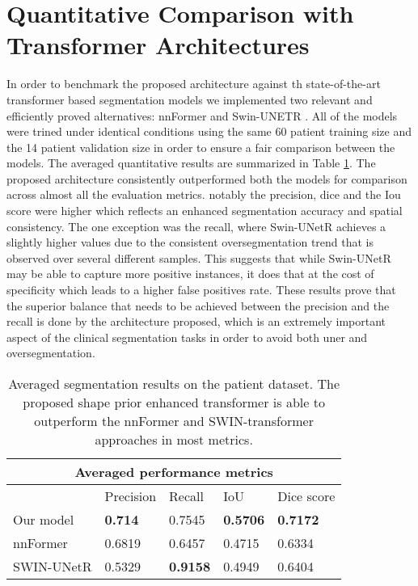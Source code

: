 \section{Quantitative Comparison with Transformer Architectures}
In order to benchmark the proposed architecture against th state-of-the-art transformer based segmentation models we implemented two relevant and efficiently proved alternatives: nnFormer \cite{zhou2023nnformer} and Swin-UNETR \cite{10.1007/978-3-031-08999-2_22}. All of the models were trined under identical conditions using the same 60 patient training size and the 14 patient validation size in order to ensure a fair comparison between the models. The averaged quantitative results are summarized in Table \ref{tab:quantitative_comparison}. The proposed architecture consistently outperformed both the models for comparison across almost all the evaluation metrics. notably the precision, dice and the Iou score were higher which reflects an enhanced segmentation accuracy and spatial consistency. The one exception was the recall, where Swin-UNetR achieves a slightly higher values due to the consistent oversegmentation trend that is observed over several different samples. This suggests that while Swin-UNetR may be able to capture more positive instances, it does that at the cost of specificity which leads to a higher false positives rate. These results prove that the superior balance that needs to be achieved between the precision and the recall is done by the architecture proposed, which is an extremely important aspect of the clinical segmentation tasks in order to avoid both uner and oversegmentation.

\begin{table}[h!t]
    \begin{tabular}{ |p{2.3cm}|p{2.3cm}|p{2.3cm}|p{2.3cm}|p{2.3cm}|}
            \hline
            \multicolumn{5}{|c|}{Averaged performance metrics} \\
            \hline
             & Precision & Recall & IoU & Dice score \\
            \hline
            Our model & \textbf{0.714} & 0.7545 & \textbf{0.5706} & \textbf{0.7172} \\
            \hline
            nnFormer & 0.6819 & 0.6457 & 0.4715 & 0.6334 \\
            \hline
            SWIN-UNetR & 0.5329 & \textbf{0.9158} & 0.4949 & 0.6404 \\
            \hline
    \end{tabular}
    \caption{Averaged segmentation results on the patient dataset. The proposed shape prior enhanced transformer is able to outperform the nnFormer \cite{zhou2023nnformer} and SWIN-transformer \cite{10.1007/978-3-031-08999-2_22} approaches in most metrics.}
    \label{tab:quantitative_comparison}
  \end{table}



